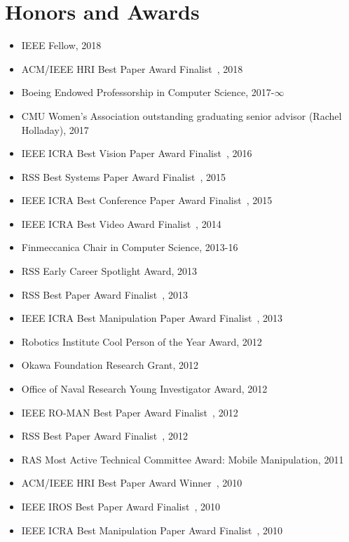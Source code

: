 

\section{Honors and Awards}
\begin{itemize}
\addtolength{\itemsep}{-0.5\baselineskip}
\item IEEE Fellow, 2018
\item ACM/IEEE HRI Best Paper Award Finalist~\cite{nikolaidis2018trust}, 2018
\item Boeing Endowed Professorship in Computer Science, 2017-$\infty$
\item CMU Women’s Association outstanding graduating senior advisor (Rachel Holladay), 2017
\item IEEE ICRA Best Vision Paper Award Finalist~\cite{klingensmith2016armslamconf}, 2016
\item RSS Best Systems Paper Award Finalist~\cite{klingensmith2015chisel}, 2015
\item IEEE ICRA Best Conference Paper Award Finalist~\cite{dragan2015dmp}, 2015
\item IEEE ICRA Best Video Award Finalist~\cite{chavandafle2014extrinsic}, 2014
\item Finmeccanica Chair in Computer Science, 2013-16
\item RSS Early Career Spotlight Award, 2013
\item RSS Best Paper Award Finalist~\cite{dragan2013legible}, 2013
\item IEEE ICRA Best Manipulation Paper Award Finalist~\cite{javdani2013tactile}, 2013
\item Robotics Institute Cool Person of the Year Award, 2012
\item Okawa Foundation Research Grant, 2012
\item Office of Naval Research Young Investigator Award, 2012
\item IEEE RO-MAN Best Paper Award Finalist~\cite{dragan2012custom}, 2012
\item RSS Best Paper Award Finalist~\cite{dragan2012formalizing}, 2012
\item RAS Most Active Technical Committee Award: Mobile Manipulation, 2011 
\item ACM/IEEE HRI Best Paper Award Winner~\cite{lee2010gracefully}, 2010
\item IEEE IROS Best Paper Award Finalist~\cite{dogar2010pushgrasp}, 2010
\item IEEE ICRA Best Manipulation Paper Award Finalist~\cite{chang2010pregrasp}, 2010

\end{itemize}
